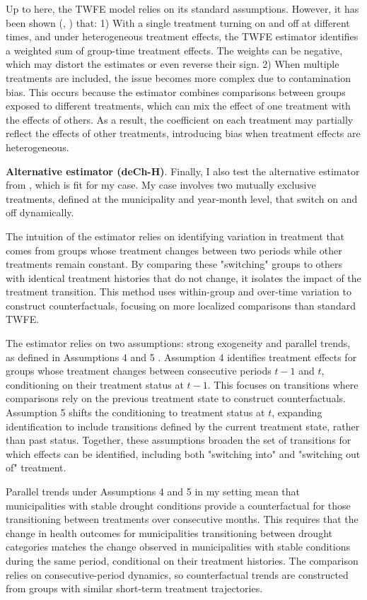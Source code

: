 \documentclass[12pt, oneside]{article}      %
\begin{document}
Up to here, the TWFE model relies on its standard assumptions. However, it has been shown (\cite{deChaisemartin2020}, \cite{deChaisemartin2023}) that: 1) With a single treatment turning on and off at different times, and under heterogeneous treatment effects, the TWFE estimator identifies a weighted sum of group-time treatment effects. The weights can be negative, which may distort the estimates or even reverse their sign. 2) When multiple treatments are included, the issue becomes more complex due to contamination bias. This occurs because the estimator combines comparisons between groups exposed to different treatments, which can mix the effect of one treatment with the effects of others. As a result, the coefficient on each treatment may partially reflect the effects of other treatments, introducing bias when treatment effects are heterogeneous.


\textbf{Alternative estimator (deCh-H)}. Finally, I also test the alternative estimator from \cite{deChaisemartin2023}, which is fit for my case. My case involves two mutually exclusive treatments, defined at the municipality and year-month level, that switch on and off dynamically.

The intuition of the estimator relies on identifying variation in treatment that comes from groups whose treatment changes between two periods while other treatments remain constant. By comparing these "switching" groups to others with identical treatment histories that do not change, it isolates the impact of the treatment transition. This method uses within-group and over-time variation to construct counterfactuals, focusing on more localized comparisons than standard TWFE.

The estimator relies on two assumptions: strong exogeneity and parallel trends, as defined in Assumptions 4 and 5 \cite{deChaisemartin2023}. Assumption 4 identifies treatment effects for groups whose treatment changes between consecutive periods $t-1$ and $t$, conditioning on their treatment status at $t-1$. This focuses on transitions where comparisons rely on the previous treatment state to construct counterfactuals. Assumption 5 shifts the conditioning to treatment status at $t$, expanding identification to include transitions defined by the current treatment state, rather than past status. Together, these assumptions broaden the set of transitions for which effects can be identified, including both "switching into" and "switching out of" treatment.

Parallel trends under Assumptions 4 and 5 in my setting mean that municipalities with stable drought conditions provide a counterfactual for those transitioning between treatments over consecutive months. This requires that the change in health outcomes for municipalities transitioning between drought categories matches the change observed in municipalities with stable conditions during the same period, conditional on their treatment histories. The comparison relies on consecutive-period dynamics, so counterfactual trends are constructed from groups with similar short-term treatment trajectories.
\end{document}

